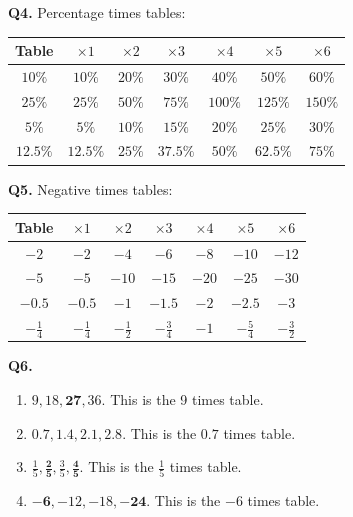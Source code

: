 \documentclass[11pt,a4paper]{article}
\begin{document}
\textbf{Q4.} Percentage times tables:
\begin{center}\small
\begin{tabular}{|c|*{6}{c|}}\hline
Table & \(\times1\) & \(\times2\) & \(\times3\) & \(\times4\) & \(\times5\) & \(\times6\)\\\hline
\(10\%\) & \(10\%\) & \(20\%\) & \(30\%\) & \(40\%\) & \(50\%\) & \(60\%\)\\
\(25\%\) & \(25\%\) & \(50\%\) & \(75\%\) & \(100\%\) & \(125\%\) & \(150\%\)\\
\(5\%\) & \(5\%\) & \(10\%\) & \(15\%\) & \(20\%\) & \(25\%\) & \(30\%\)\\
\(12.5\%\) & \(12.5\%\) & \(25\%\) & \(37.5\%\) & \(50\%\) & \(62.5\%\) & \(75\%\)\\\hline
\end{tabular}
\end{center}

\textbf{Q5.} Negative times tables:
\begin{center}\small
\begin{tabular}{|c|*{6}{c|}}\hline
Table & \(\times1\) & \(\times2\) & \(\times3\) & \(\times4\) & \(\times5\) & \(\times6\)\\\hline
\(-2\) & \(-2\) & \(-4\) & \(-6\) & \(-8\) & \(-10\) & \(-12\)\\
\(-5\) & \(-5\) & \(-10\) & \(-15\) & \(-20\) & \(-25\) & \(-30\)\\
\(-0.5\) & \(-0.5\) & \(-1\) & \(-1.5\) & \(-2\) & \(-2.5\) & \(-3\)\\
\(-\frac14\) & \(-\frac14\) & \(-\frac12\) & \(-\frac34\) & \(-1\) & \(-\frac54\) & \(-\frac32\)\\\hline
\end{tabular}
\end{center}

\textbf{Q6.}
\begin{enumerate}[label=(\alph*)]
\item \(9,18,\mathbf{27},36\). This is the 9 times table.
\item \(0.7,\mathbf{1.4},2.1,2.8\). This is the \(0.7\) times table.
\item \(\frac15,\mathbf{\frac25},\frac35,\mathbf{\frac45}\). This is the \(\frac15\) times table.
\item \(\mathbf{-6},-12,-18,\mathbf{-24}\). This is the \(-6\) times table.
\end{enumerate}
\end{document}
